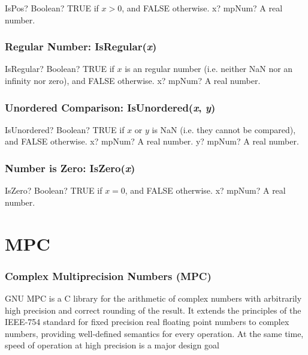 \begin{mpFunctionsExtract}
	\mpFunctionOne
	{IsPos? Boolean? TRUE if $x > 0$, and FALSE otherwise.}
	{x? mpNum? A real number.}
\end{mpFunctionsExtract}




\subsection{Regular Number: IsRegular(\textit{x})}

\begin{mpFunctionsExtract}
	\mpFunctionOne
	{IsRegular? Boolean? TRUE if $x$ is an regular number (i.e. neither NaN nor an infinity nor zero), and FALSE otherwise.}
	{x? mpNum? A real number.}
\end{mpFunctionsExtract}




\subsection{Unordered Comparison: IsUnordered(\textit{x}, \textit{y})}

\begin{mpFunctionsExtract}
	\mpFunctionTwo
	{IsUnordered? Boolean? TRUE if $x$ or $y$ is NaN (i.e. they cannot be compared), and FALSE otherwise.}
	{x? mpNum? A real number.}
	{y? mpNum? A real number.}
\end{mpFunctionsExtract}




\subsection{Number is Zero: IsZero(\textit{x})}

\begin{mpFunctionsExtract}
	\mpFunctionOne
	{IsZero? Boolean? TRUE if $x = 0$, and FALSE otherwise.}
	{x? mpNum? A real number.}
\end{mpFunctionsExtract}









\chapter{MPC}


\subsection{Complex Multiprecision Numbers (MPC)}
GNU MPC is a C library for the arithmetic of complex numbers with arbitrarily high precision and correct rounding of the result. It extends the principles of the IEEE-754 standard for fixed precision real floating point numbers to complex numbers, providing well-defined semantics for every operation. At the same time, speed of operation at high precision is a major design goal

